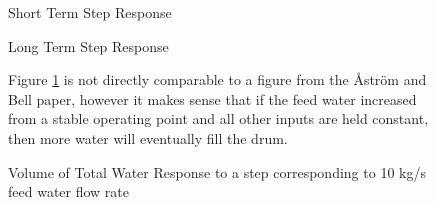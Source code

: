         \begin{figure}[ht]
            \begin{center}
                
                Short Term Step Response
                
                
                Long Term Step Response
                
                \caption{Volume of Total Water Response to a step corresponding to 10 kg/s feed water flow rate}
                \label{fig:Valve_Open2C}
            \end{center}
            Figure \ref{fig:Valve_Open2C} is not directly comparable to a figure from the \r{A}str\"{o}m and Bell paper, however it makes sense that if the feed water increased from a stable operating point and all other inputs are held constant, then more water will eventually fill the drum. 
        \end{figure}  %
        
